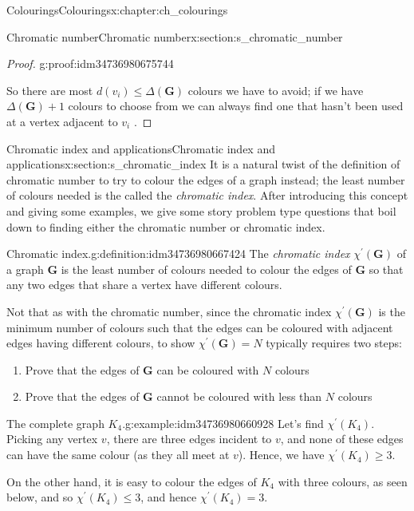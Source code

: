 \documentclass[oneside,10pt,]{book}
\numberwithin{equation}{section}
\newcommand{\bfG}{\mathbf{G}}
\begin{document}
\begin{chapterptx}{Colourings}{}{Colourings}{}{}{x:chapter:ch_colourings}
\begin{sectionptx}{Chromatic number}{}{Chromatic number}{}{}{x:section:s_chromatic_number}
\begin{proof}{}{g:proof:idm34736980675744}
\par
So there are most \(d(v_i)\leq \Delta(\bfG)\) colours we have to avoid; if we have \(\Delta(\bfG)+1\) colours to choose from we can always find one that hasn't been used at a vertex adjacent to \(v_i\)%
.\end{proof}
\end{sectionptx}
%
%
\typeout{************************************************}
\typeout{************************************************}
%
\begin{sectionptx}{Chromatic index and applications}{}{Chromatic index and applications}{}{}{x:section:s_chromatic_index}
It is a natural twist of the definition of chromatic number to try to colour the edges of a graph instead; the least number of colours needed is the called the \emph{chromatic index}.  After introducing this concept and giving some examples, we give some story problem type questions that boil down to finding either the chromatic number or chromatic index.%
\begin{definition}{Chromatic index.}{g:definition:idm34736980667424}%
The \emph{chromatic index} \(\chi^\prime(\bfG)\) of a graph \(\bfG\) is the least number of colours needed to colour the edges of \(\bfG\) so that any two edges that share a vertex have different colours.%
\end{definition}
Not that as with the chromatic number, since the chromatic index \(\chi^\prime(\bfG)\) is the minimum number of colours such that the edges can be coloured with adjacent edges having different colours, to show \(\chi^\prime(\bfG)=N\) typically requires two steps:%
%
\begin{enumerate}
\item{}Prove that the edges of \(\bfG\) can be coloured with \(N\) colours%
\item{}Prove that the edges of \(\bfG\) cannot be coloured with less than \(N\) colours%
\end{enumerate}
\begin{example}{The complete graph \(K_4\).}{g:example:idm34736980660928}%
Let's find \(\chi^\prime(K_4)\).  Picking any vertex \(v\), there are three edges incident to \(v\), and none of these edges can have the same colour (as they all meet at \(v\)).  Hence, we have \(\chi^\prime(K_4)\geq 3\).%
\par
On the other hand, it is easy to colour the edges of \(K_4\) with three colours, as seen below, and so \(\chi^\prime(K_4)\leq 3\), and hence \(\chi^\prime(K_4)=3\).%

\end{example}
\end{sectionptx}
\end{chapterptx}
\end{document}

